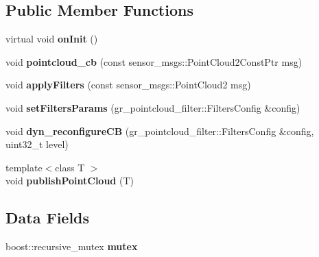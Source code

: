 \subsection*{Public Member Functions}
\begin{DoxyCompactItemize}
\item 
\mbox{\label{classgr__pointcloud__filter_1_1MyNodeletClass_a54212598b4023221422c32b01f30df19}} 
virtual void {\bfseries on\+Init} ()
\item 
\mbox{\label{classgr__pointcloud__filter_1_1MyNodeletClass_ae7a7b745d89953ecf14b6e2cf69f50b0}} 
void {\bfseries pointcloud\+\_\+cb} (const sensor\+\_\+msgs\+::\+Point\+Cloud2\+Const\+Ptr msg)
\item 
\mbox{\label{classgr__pointcloud__filter_1_1MyNodeletClass_a0908706051dfef9d90146e510739774e}} 
void {\bfseries apply\+Filters} (const sensor\+\_\+msgs\+::\+Point\+Cloud2 msg)
\item 
\mbox{\label{classgr__pointcloud__filter_1_1MyNodeletClass_aa6899374790bea970827f340f204db46}} 
void {\bfseries set\+Filters\+Params} (gr\+\_\+pointcloud\+\_\+filter\+::\+Filters\+Config \&config)
\item 
\mbox{\label{classgr__pointcloud__filter_1_1MyNodeletClass_a9225ad5807d4441e6d010ebf7c393fdf}} 
void {\bfseries dyn\+\_\+reconfigure\+CB} (gr\+\_\+pointcloud\+\_\+filter\+::\+Filters\+Config \&config, uint32\+\_\+t level)
\item 
\mbox{\label{classgr__pointcloud__filter_1_1MyNodeletClass_a5b35b21e7d08872a72c42cb8bb649c5a}} 
{\footnotesize template$<$class T $>$ }\\void {\bfseries publish\+Point\+Cloud} (T)
\end{DoxyCompactItemize}
\subsection*{Data Fields}
\begin{DoxyCompactItemize}
\item 
\mbox{\label{classgr__pointcloud__filter_1_1MyNodeletClass_af47c591307526c07fdecbb8ef3af8342}} 
boost\+::recursive\+\_\+mutex {\bfseries mutex}
\end{DoxyCompactItemize}


